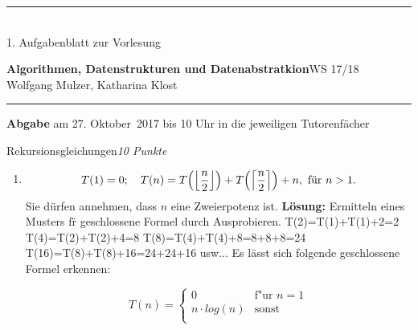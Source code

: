 \documentclass[a4paper,twoside,12pt]{article}
\newcommand{\ZETTELNUMMER}{1}
\newcommand{\ABGABEDATUM}{am 27. Oktober~2017 bis 10 Uhr in die 
  jeweiligen Tutorenf\"acher}
\newcounter{AUFGNR}
\newcommand{\AUFGABE}[2]{\vspace{0.3cm}\item[Aufgabe \arabic{AUFGNR}]\stepcounter{AUFGNR} #1\hfill\emph{#2}}
\begin{document}
\pagestyle{empty}
\hrule\medskip
\rule{0ex}{0ex}\\[-1ex]
\ZETTELNUMMER. Aufgabenblatt zur Vorlesung

\smallskip
\noindent
\large
\textbf{Algorithmen, Datenstrukturen und Datenabstratkion}\hfill WS 17/18 \\[0.5ex]
\normalsize
Wolfgang Mulzer, Katharina Klost

\medskip\hrule

\smallskip
\noindent
\textbf{Abgabe} \ABGABEDATUM

\vskip 0.5cm

\begin{description}

\AUFGABE{Rekursionsgleichungen}{10 Punkte}

\begin{enumerate}
  \item
    \[
       T(1) = 0; \quad T(n) = 
       T\Bigl(\left\lfloor \frac{n}{2}\right\rfloor\Bigr) +
                 T\Bigl(\left\lceil \frac{n}{2} \right\rceil\Bigr) + n, 
		 \text{ f\"ur } n > 1.
    \]
    Sie d\"urfen annehmen, dass $n$ eine Zweierpotenz ist.
\newline    
\newline  
\textbf{L\"osung:}
\newline  Ermitteln eines Musters f\"r geschlossene Formel durch Ausprobieren.
\newline T(2)=T(1)+T(1)+2=2
\newline T(4)=T(2)+T(2)+4=8
\newline T(8)=T(4)+T(4)+8=8+8+8=24
\newline T(16)=T(8)+T(8)+16=24+24+16
\newline usw...
\newline
\newline Es lässt sich folgende geschlossene Formel erkennen: 

\begin{equation*}
   T(n) =
   \begin{cases}
     0 & \text{f"ur } n=1 \\
     n \cdot log(n) & \text{sonst} \\
   \end{cases}
\end{equation*}


\end{enumerate}
\end{description}
\end{document}
